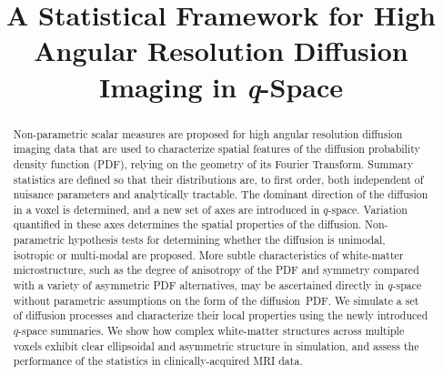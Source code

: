 \documentclass[dvips,aoas,preprint]{imsart}
\numberwithin{equation}{section}
\theoremstyle{plain}
\begin{document}
\begin{frontmatter}
\title{A Statistical Framework for High Angular Resolution Diffusion Imaging in {\em q}-Space}


\begin{abstract}
Non-parametric scalar measures are proposed for high angular
resolution diffusion imaging data that are used to characterize
spatial features of the diffusion probability density function (PDF),
relying on the geometry of its Fourier Transform.  Summary statistics
are defined so that their distributions are, to first order, both
independent of nuisance parameters and analytically tractable.  The
dominant direction of the diffusion in a voxel is determined, and a
new set of axes are introduced in $q$-space.  Variation quantified in
these axes determines the spatial properties of the diffusion.
Non-parametric hypothesis tests for determining whether the diffusion
is unimodal, isotropic or multi-modal are proposed.  More subtle
characteristics of white-matter microstructure, such as the degree of
anisotropy of the PDF and symmetry compared with a variety of
asymmetric PDF alternatives, may be ascertained directly in $q$-space
without parametric assumptions on the form of the diffusion~PDF.  We
simulate a set of diffusion processes and characterize their local
properties using the newly introduced $q$-space summaries.  We show
how complex white-matter structures across multiple voxels exhibit
clear ellipsoidal and asymmetric structure in simulation, and assess
the performance of the statistics in clinically-acquired MRI data.
\end{abstract}


\end{frontmatter}
\end{document}
